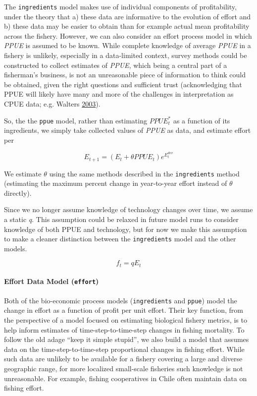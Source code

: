 \documentclass[twoside,12pt,final]{ucthesis-CA2012}
\begin{document}
\begin{ucmainmatter}
The \texttt{ingredients} model makes use of individual components of
profitability, under the theory that a) these data are informative to
the evolution of effort and b) these data may be easier to obtain than
for example actual mean profitability across the fishery. However, we
can also consider an effort process model in which \emph{PPUE} is
assumed to be known. While complete knowledge of average \emph{PPUE} in
a fishery is unlikely, especially in a data-limited context, survey
methods could be constructed to collect estimates of \emph{PPUE}, which
being a central part of a fisherman's business, is not an unreasonable
piece of information to think could be obtained, given the right
questions and sufficient trust (acknowledging that PPUE will likely have
many and more of the challenges in interpretation as CPUE data; e.g.
Walters \protect\hyperlink{ref-Walters2003}{2003}).

So, the the \texttt{ppue} model, rather than estimating \(PPUE_{t}^*\)
as a function of its ingredients, we simply take collected values of
\emph{PPUE} as data, and estimate effort per

\[E_{t + 1} = (E_{t} + \theta{PPUE_{t}})e^{E^{dev}_{t}}\]

We estimate \(\theta\) using the same methods described in the
\texttt{ingredients} method (estimating the maximum percent change in
year-to-year effort instead of \(\theta\) directly).

Since we no longer assume knowledge of technology changes over time, we
assume a static \emph{q}. This assumption could be relaxed in future
model runs to consider knowledge of both PPUE and technology, but for
now we make this assumption to make a cleaner distinction between the
\texttt{ingredients} model and the other models.

\[f_{t} = qE_{t}\]

\paragraph{\texorpdfstring{Effort Data Model
(\texttt{effort})}{Effort Data Model (effort)}}\label{effort-data-model-effort}

Both of the bio-economic process models (\texttt{ingredients} and
\texttt{ppue}) model the change in effort as a function of profit per
unit effort. Their key function, from the perspective of a model focused
on estimating biological fishery metrics, is to help inform estimates of
time-step-to-time-step changes in fishing mortality. To follow the old
adage ``keep it simple stupid'', we also build a model that assumes data
on the time-step-to-time-step proportional changes in fishing effort.
While such data are unlikely to be available for a fishery covering a
large and diverse geographic range, for more localized small-scale
fisheries such knowledge is not unreasonable. For example, fishing
cooperatives in Chile often maintain data on fishing effort.


\end{ucmainmatter}
\end{document}
